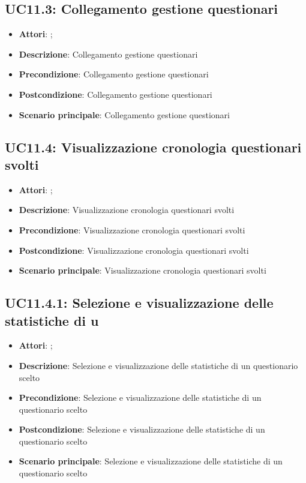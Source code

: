 \subsection{UC11.3: Collegamento gestione questionari}
\label{UC11.3}
\begin{itemize}
\item \textbf{Attori}: ;
\item \textbf{Descrizione}: Collegamento gestione questionari
\item \textbf{Precondizione}: Collegamento gestione questionari
\item \textbf{Postcondizione}: Collegamento gestione questionari
\item \textbf{Scenario principale}:
Collegamento gestione questionari
\end{itemize}

\subsection{UC11.4: Visualizzazione cronologia questionari svolti}
\label{UC11.4}
\begin{itemize}
\item \textbf{Attori}: ;
\item \textbf{Descrizione}: Visualizzazione cronologia questionari svolti
\item \textbf{Precondizione}: Visualizzazione cronologia questionari svolti
\item \textbf{Postcondizione}: Visualizzazione cronologia questionari svolti
\item \textbf{Scenario principale}:
Visualizzazione cronologia questionari svolti
\end{itemize}

\subsection{UC11.4.1: Selezione e visualizzazione delle statistiche di u}
\label{UC11.4.1}
\begin{itemize}
\item \textbf{Attori}: ;
\item \textbf{Descrizione}: Selezione e visualizzazione delle statistiche di un questionario scelto
\item \textbf{Precondizione}: Selezione e visualizzazione delle statistiche di un questionario scelto
\item \textbf{Postcondizione}: Selezione e visualizzazione delle statistiche di un questionario scelto
\item \textbf{Scenario principale}:
Selezione e visualizzazione delle statistiche di un questionario scelto
\end{itemize}

